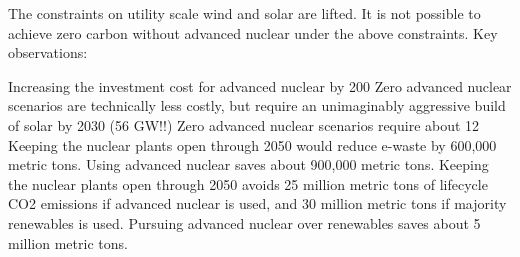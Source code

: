 The constraints on utility scale wind and solar are lifted. It is not possible to achieve zero carbon without advanced nuclear under the above constraints.
Key observations:

Increasing the investment cost for advanced nuclear by 200%
Zero advanced nuclear scenarios are technically less costly, but require an unimaginably aggressive build of solar by 2030 (56 GW!!)
Zero advanced nuclear scenarios require about 12%
Keeping the nuclear plants open through 2050 would reduce e-waste by 600,000 metric tons. Using advanced nuclear saves about 900,000 metric tons.
Keeping the nuclear plants open through 2050 avoids 25 million metric tons of lifecycle CO2 emissions if advanced nuclear is used, and 30 million metric tons if majority renewables is used. Pursuing advanced nuclear over renewables saves about 5 million metric tons.
